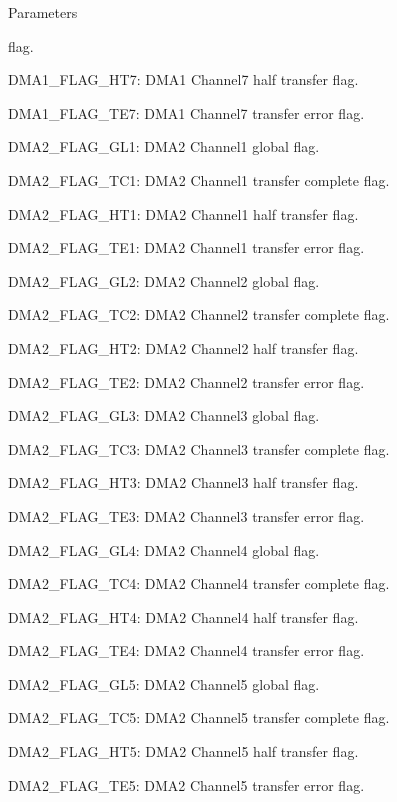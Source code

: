 \begin{DoxyParams}{Parameters}
\begin{DoxyItemize}
flag. \item D\+M\+A1\+\_\+\+F\+L\+A\+G\+\_\+\+H\+T7\+: D\+M\+A1 Channel7 half transfer flag. \item D\+M\+A1\+\_\+\+F\+L\+A\+G\+\_\+\+T\+E7\+: D\+M\+A1 Channel7 transfer error flag. \item D\+M\+A2\+\_\+\+F\+L\+A\+G\+\_\+\+G\+L1\+: D\+M\+A2 Channel1 global flag. \item D\+M\+A2\+\_\+\+F\+L\+A\+G\+\_\+\+T\+C1\+: D\+M\+A2 Channel1 transfer complete flag. \item D\+M\+A2\+\_\+\+F\+L\+A\+G\+\_\+\+H\+T1\+: D\+M\+A2 Channel1 half transfer flag. \item D\+M\+A2\+\_\+\+F\+L\+A\+G\+\_\+\+T\+E1\+: D\+M\+A2 Channel1 transfer error flag. \item D\+M\+A2\+\_\+\+F\+L\+A\+G\+\_\+\+G\+L2\+: D\+M\+A2 Channel2 global flag. \item D\+M\+A2\+\_\+\+F\+L\+A\+G\+\_\+\+T\+C2\+: D\+M\+A2 Channel2 transfer complete flag. \item D\+M\+A2\+\_\+\+F\+L\+A\+G\+\_\+\+H\+T2\+: D\+M\+A2 Channel2 half transfer flag. \item D\+M\+A2\+\_\+\+F\+L\+A\+G\+\_\+\+T\+E2\+: D\+M\+A2 Channel2 transfer error flag. \item D\+M\+A2\+\_\+\+F\+L\+A\+G\+\_\+\+G\+L3\+: D\+M\+A2 Channel3 global flag. \item D\+M\+A2\+\_\+\+F\+L\+A\+G\+\_\+\+T\+C3\+: D\+M\+A2 Channel3 transfer complete flag. \item D\+M\+A2\+\_\+\+F\+L\+A\+G\+\_\+\+H\+T3\+: D\+M\+A2 Channel3 half transfer flag. \item D\+M\+A2\+\_\+\+F\+L\+A\+G\+\_\+\+T\+E3\+: D\+M\+A2 Channel3 transfer error flag. \item D\+M\+A2\+\_\+\+F\+L\+A\+G\+\_\+\+G\+L4\+: D\+M\+A2 Channel4 global flag. \item D\+M\+A2\+\_\+\+F\+L\+A\+G\+\_\+\+T\+C4\+: D\+M\+A2 Channel4 transfer complete flag. \item D\+M\+A2\+\_\+\+F\+L\+A\+G\+\_\+\+H\+T4\+: D\+M\+A2 Channel4 half transfer flag. \item D\+M\+A2\+\_\+\+F\+L\+A\+G\+\_\+\+T\+E4\+: D\+M\+A2 Channel4 transfer error flag. \item D\+M\+A2\+\_\+\+F\+L\+A\+G\+\_\+\+G\+L5\+: D\+M\+A2 Channel5 global flag. \item D\+M\+A2\+\_\+\+F\+L\+A\+G\+\_\+\+T\+C5\+: D\+M\+A2 Channel5 transfer complete flag. \item D\+M\+A2\+\_\+\+F\+L\+A\+G\+\_\+\+H\+T5\+: D\+M\+A2 Channel5 half transfer flag. \item D\+M\+A2\+\_\+\+F\+L\+A\+G\+\_\+\+T\+E5\+: D\+M\+A2 Channel5 transfer error flag. \end{DoxyItemize}
\\
\hline
\end{DoxyParams}

